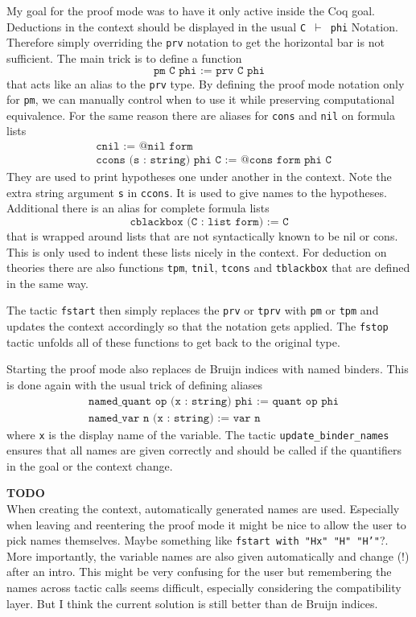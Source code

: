 \documentclass[12pt, a4paper]{article}
\newcommand{\coq}[1]{\texttt{#1}}
\newcommand{\improve}[1]{
	\vspace{3pt}
	\begin{boximprove}
		\parbox{\textwidth}{\textcolor{colorimprove}{\textbf{TODO}\\#1}}
	\end{boximprove}}
\begin{document}
My goal for the proof mode was to have it only active inside the Coq goal.
Deductions in the context should be displayed in the usual \texttt{C $\vdash$ phi} Notation.
Therefore simply overriding the \texttt{prv} notation to get the horizontal bar is not sufficient.
The main trick is to define a function
$$\coq{pm C phi := prv C phi}$$
that acts like an alias to the \texttt{prv} type.
By defining the proof mode notation only for \texttt{pm}, we can manually control when to use it while preserving computational equivalence.
For the same reason there are aliases for \texttt{cons} and \texttt{nil} on formula lists
\begin{align*}
	&\coq{cnil := @nil form} \\
	&\coq{ccons (s : string) phi C  := @cons form phi C}
\end{align*}
They are used to print hypotheses one under another in the context.
Note the extra string argument \texttt{s} in \texttt{ccons}.
It is used to give names to the hypotheses.
Additional there is an alias for complete formula lists
$$\coq{cblackbox (C : list form) := C}$$
that is wrapped around lists that are not syntactically known to be nil or cons.
This is only used to indent these lists nicely in the context.
For deduction on theories there are also functions \texttt{tpm}, \texttt{tnil}, \texttt{tcons} and \texttt{tblackbox} that are defined in the same way.

\medskip\noindent
The tactic \texttt{fstart} then simply replaces the \texttt{prv} or \texttt{tprv} with \texttt{pm} or \texttt{tpm} and updates the context accordingly so that the notation gets applied. The \texttt{fstop} tactic unfolds all of these functions to get back to the original type.

Starting the proof mode also replaces de Bruijn indices with named binders. This is done again with the usual trick of defining aliases
\begin{align*}
	&\coq{named_quant op (x : string) phi := quant op phi} \\
	&\coq{named_var n (x : string) := var n}
\end{align*}
where \texttt{x} is the display name of the variable.
The tactic \texttt{update\_binder\_names} ensures that all names are given correctly and should be called if the quantifiers in the goal or the context change.

\improve{When creating the context, automatically generated names are used. Especially when leaving and reentering the proof mode it might be nice to allow the user to pick names themselves. Maybe something like \texttt{fstart with "Hx" "H" "H'"}?.
\medskip\\
More importantly, the variable names are also given automatically and change (!) after an intro. This might be very confusing for the user but remembering the names across tactic calls seems difficult, especially considering the compatibility layer. But I think the current solution is still better than de Bruijn indices.}
\end{document}
